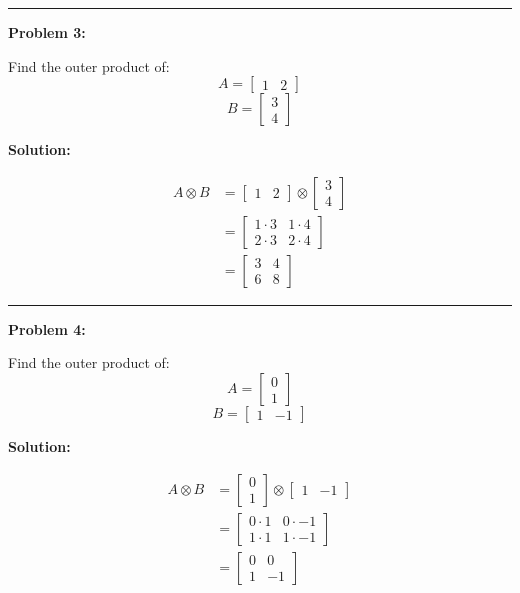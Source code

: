 \documentclass[
  letterpaper,
  DIV=11,
  numbers=noendperiod]{scrreprt}
\theoremstyle{plain}
\theoremstyle{definition}
\theoremstyle{remark}
\begin{document}
\begin{center}\rule{0.5\linewidth}{0.5pt}\end{center}

\textbf{Problem 3:}

Find the outer product of: \[A=\begin{bmatrix}1&2\end{bmatrix}\]
\[B=\begin{bmatrix}3\\4\end{bmatrix}\]

\textbf{Solution:}

\begin{align*}
A \otimes B &= \begin{bmatrix}1&2\end{bmatrix} \otimes \begin{bmatrix}3\\4\end{bmatrix} \\
&= \begin{bmatrix}
1 \cdot 3 & 1 \cdot 4 \\
2 \cdot 3 & 2 \cdot 4
\end{bmatrix} \\
&= \begin{bmatrix}
3 & 4 \\
6 & 8
\end{bmatrix}
\end{align*}

\begin{center}\rule{0.5\linewidth}{0.5pt}\end{center}

\textbf{Problem 4:}

Find the outer product of: \[A=\begin{bmatrix}0\\1\end{bmatrix}\]
\[B=\begin{bmatrix}1&-1\end{bmatrix}\]

\textbf{Solution:}

\begin{align*}
A \otimes B &= \begin{bmatrix}0\\1\end{bmatrix} \otimes \begin{bmatrix}1&-1\end{bmatrix} \\
&= \begin{bmatrix}
0 \cdot 1 & 0 \cdot -1 \\
1 \cdot 1 & 1 \cdot -1
\end{bmatrix} \\
&= \begin{bmatrix}
0 & 0 \\
1 & -1
\end{bmatrix}
\end{align*}
\end{document}
